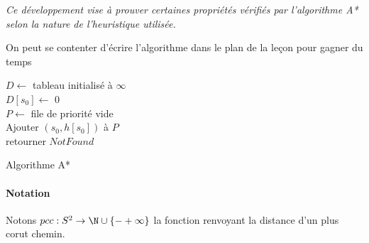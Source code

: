 
\textit{Ce développement vise à prouver certaines propriétés vérifiés par l'algorithme A* selon la nature de l'heuristique utilisée.}

\begin{com}
	On peut se contenter d'écrire l'algorithme dans le plan de la leçon pour gagner du temps
\end{com}

\begin{algorithm}[H]
	
	$D \gets$ tableau initialisé à $\infty$\\
	$D[s_{0}] \gets$ 0\\
	$P \gets$ file de priorité vide\\
	Ajouter $(s_{0}, h[s_{0}])$ à $P$\\
	retourner $Not Found$
	\caption{Algorithme A*}
\end{algorithm}

\paragraph{Notation} Notons $pcc : S^2 \to \N \cup \{-+\infty\}$ la fonction renvoyant la distance d'un plus corut chemin.

